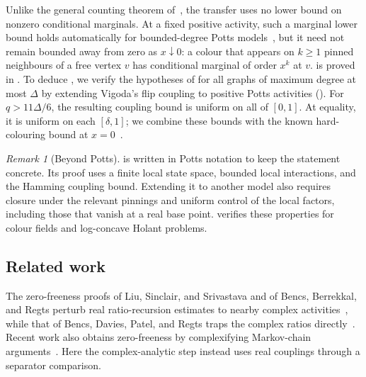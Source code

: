 \documentclass[11pt,reqno]{article}
\theoremstyle{plain}
\theoremstyle{definition}
\theoremstyle{remark}
\newtheorem{remark}[theorem]{Remark}
\theoremstyle{definition}
\theoremstyle{remark}
\newtheorem{remark}[remark]{Remark}
\newcommand{\Deg}{\Delta}                        %
\begin{document}
Unlike the general counting theorem of~\cite[Theorem~4]{CFFGZZ2024},
the transfer uses no lower bound on nonzero conditional marginals.  At a
fixed positive activity, such a marginal lower bound holds automatically
for bounded-degree Potts models~\cite[Observation~10]{CFFGZZ2024}, but
it need not remain bounded away from zero as \(x\downarrow0\): a colour
that appears on \(k\ge1\) pinned neighbours of a free vertex \(v\) has
conditional marginal of order \(x^k\) at \(v\).   is
proved in .  To deduce ,
we verify the hypotheses of  for all graphs of
maximum degree at most \(\Deg\) by extending Vigoda's flip coupling to positive Potts activities
().  For \(q>11\Deg/6\), the resulting
coupling bound is uniform on all of \([0,1]\).  At equality, it is
uniform on each \([\delta,1]\); we combine these bounds with the known
hard-colouring bound at \(x=0\)~\cite[Theorem~20]{CFFGZZ2024}.

\begin{remark}[Beyond Potts]
\label{rem:beyond-potts}
 is written in Potts notation to keep the
statement concrete.  Its proof uses a finite local state space, bounded
local interactions, and the Hamming coupling bound.  Extending it to
another model also requires closure under the relevant pinnings and
uniform control of the local factors, including those that vanish at a
real base point.   verifies these
properties for colour fields and log-concave Holant problems.
\end{remark}

\subsection{Related work}

The zero-freeness proofs of Liu, Sinclair, and Srivastava and of Bencs,
Berrekkal, and Regts perturb real ratio-recursion estimates to nearby
complex activities~\cite{LiuSinclairSrivastava2025,BencsBerrekkalRegts2026},
while that of Bencs, Davies, Patel, and Regts traps the complex ratios
directly~\cite{BencsDaviesPatelRegts2021}.
Recent work also obtains zero-freeness by complexifying Markov-chain
arguments~\cite{LiuWangYinYu2025,LiuYu2026}.  Here the complex-analytic
step instead uses real couplings through a separator comparison.
\end{document}
